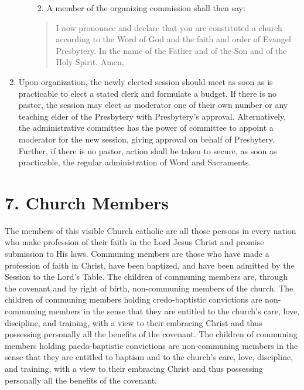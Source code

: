 \documentclass[
]{book}
\providecommand{\tightlist}{%
  \setlength{\itemsep}{0pt}\setlength{\parskip}{0pt}}
\begin{document}
\begin{enumerate}
\begin{enumerate}
    \begin{enumerate}
    \def\labelenumiii{\roman{enumiii}.}
    \setcounter{enumiii}{3}
    \tightlist
    \item
      A member of the organizing commission shall then say:
    \end{enumerate}

    \begin{quote}
    I now pronounce and declare that you are constituted a church according to the Word of God and the faith and order of Evangel Presbytery. In the name of the Father and of the Son and of the Holy Spirit. Amen.
    \end{quote}
  \end{enumerate}
\item
  Upon organization, the newly elected session should meet as soon as is practicable to elect a stated clerk and formulate a budget. If there is no pastor, the session may elect as moderator one of their own number or any teaching elder of the Presbytery with Presbytery's approval. Alternatively, the administrative committee has the power of committee to appoint a moderator for the new session, giving approval on behalf of Presbytery. Further, if there is no pastor, action shall be taken to secure, as soon as practicable, the regular administration of Word and Sacraments.
\end{enumerate}

\hypertarget{church-members}{%
\section*{7. Church Members}\label{church-members}}

\protect\hypertarget{chapter-slug-7-church-members}{\href{}{}}

\protect\hypertarget{7}{\href{}{}}The members of this visible Church catholic are all those persons in every nation who make profession of their faith in the Lord Jesus Christ and promise submission to His laws. Communing members are those who have made a profession of faith in Christ, have been baptized, and have been admitted by the Session to the Lord's Table. The children of communing members are, through the covenant and by right of birth, non-communing members of the church. The children of communing members holding credo-baptistic convictions are non-communing members in the sense that they are entitled to the church's care, love, discipline, and training, with a view to their embracing Christ and thus possessing personally all the benefits of the covenant. The children of communing members holding paedo-baptistic convictions are non-communing members in the sense that they are entitled to baptism and to the church's care, love, discipline, and training, with a view to their embracing Christ and thus possessing personally all the benefits of the covenant.
\end{document}
